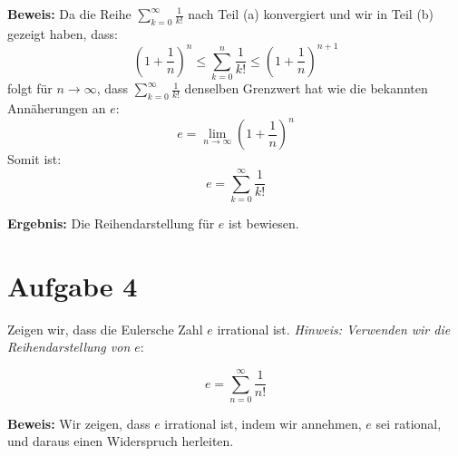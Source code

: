 \documentclass[11pt]{article}
\begin{document}
\textbf{Beweis:} Da die Reihe \(\sum_{k=0}^\infty \frac{1}{k!}\) nach Teil (a) konvergiert und wir in Teil (b) gezeigt haben, dass:
\[
\left( 1 + \frac{1}{n} \right)^n \leq \sum_{k=0}^n \frac{1}{k!} \leq \left( 1 + \frac{1}{n} \right)^{n+1}
\]
folgt für \(n \to \infty\), dass \(\sum_{k=0}^\infty \frac{1}{k!}\) denselben Grenzwert hat wie die bekannten Annäherungen an \(e\):
\[
e = \lim_{n \to \infty} \left( 1 + \frac{1}{n} \right)^n
\]
Somit ist:
\[
e = \sum_{k=0}^\infty \frac{1}{k!}
\]

\textbf{Ergebnis:} Die Reihendarstellung für \(e\) ist bewiesen.

\section*{Aufgabe 4}

Zeigen wir, dass die Eulersche Zahl \(e\) irrational ist.
\textit{Hinweis: Verwenden wir die Reihendarstellung von \(e\)}:

\[
e = \sum_{n=0}^\infty \frac{1}{n!}
\]

\textbf{Beweis:} Wir zeigen, dass \(e\) irrational ist, indem wir annehmen, \(e\) sei rational, und daraus einen Widerspruch herleiten.
\end{document}
